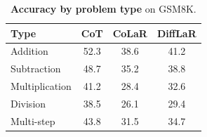 \documentclass{article}
\begin{document}
\begin{table}[h]
\centering
\caption{\textbf{Accuracy by problem type} on GSM8K.}
\label{tab:problem_type}
\begin{tabular}{lccc}
\toprule
\textbf{Type} & \textbf{CoT} & \textbf{CoLaR} & \textbf{DiffLaR} \\
\midrule
Addition & 52.3 & 38.6 & 41.2 \\
Subtraction & 48.7 & 35.2 & 38.8 \\
Multiplication & 41.2 & 28.4 & 32.6 \\
Division & 38.5 & 26.1 & 29.4 \\
Multi-step & 43.8 & 31.5 & 34.7 \\
\bottomrule
\end{tabular}
\end{table}
\end{document}
